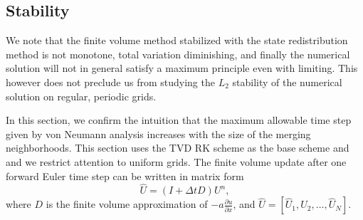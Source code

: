 \subsection{Stability}
We note that the finite volume method stabilized with the state redistribution method is not monotone, total variation diminishing, and finally the numerical solution will not in general satisfy a maximum principle even with limiting.
This however does not preclude us from studying the $L_2$ stability of the numerical solution on regular, periodic grids.

In this section, we confirm the intuition that the maximum allowable time step given by von Neumann analysis increases with the size of the merging neighborhoods.  
This section uses the TVD RK scheme as the base scheme and and we restrict
attention to uniform grids.
The finite volume update after one forward Euler time step can be written in 
matrix form
\begin{equation}\label{eq:L}
    \hat U = (I + \Delta t D)U^n,
\end{equation}
where $D$ is the finite volume approximation of $-a\frac{\partial u}{\partial x}$, and $\hat U = [\hat U_1, \hat U_2, \hdots, \hat U_N]$.
